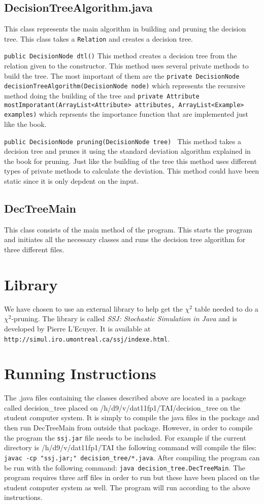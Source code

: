 \documentclass[a4paper]{article}
\begin{document}
\subsection{DecisionTreeAlgorithm.java}
This class represents the main algorithm in building and pruning the decision tree. This class takes a \texttt{Relation} and creates a decision tree.
\item[\texttt{public DecisionNode dtl()}] This method creates a decision tree from the relation given to the constructor. This method uses several private methods to build the tree. The most important of them are the \texttt{private DecisionNode decisionTreeAlgorithm(DecisionNode node)} which represents the recursive method doing the building of the tree and \texttt{private Attribute mostImporatant(ArrayList<Attribute> attributes, ArrayList<Example> examples)} which reprsents the importance function that are implemented just like the book. 
\item[\texttt{public DecisionNode pruning(DecisionNode tree) }] This method takes a decision tree and prunes it using the standard deviation algorithm explained in the book for pruning. Just like the building of the tree this method uses different types of private methods to calculate the deviation. This method could have been static since it is only depdent on the input. 
\subsection{DecTreeMain}
This class consists of the main method of the program. This starts the program and initiates all the necessary classes and runs the decision tree algorithm for three different files.

\section{Library}
We have chosen to use an external library to help get the $\chi^{2}$ table needed to do a $\chi^{2}$-pruning. The library is called \emph{SSJ: Stochastic Simulation in Java} and is developed by Pierre L'Ecuyer. It is available at \texttt{http://simul.iro.umontreal.ca/ssj/indexe.html}.


\section{Running Instructions} The .java files containing the classes described
above are located in a package called decision\_tree placed on
/h/d9/v/dat11fp1/TAI/decision\_tree on the student computer system. It
is simply to compile the java files in the package and then run DecTreeMain from
outside that package. However, in order to compile the program the \texttt{ssj.jar} file needs to be included. For example if the current directory is
/h/d9/v/dat11fp1/TAI the following command will compile the files: \texttt{javac -cp "ssj.jar;"
decision\_tree/*.java}. After compiling the program can be run with
the following command: \texttt{java decision\_tree.DecTreeMain}. The program requires three arff files in order to run but these have been placed on the student computer system as well. The program will run according to the above instructions.
\end{document}
